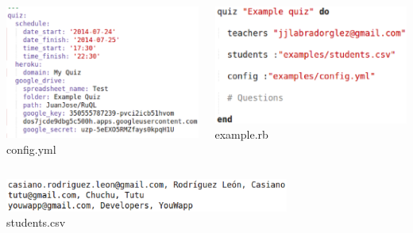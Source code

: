 \documentclass{beamer}
\begin{document}
\begin{frame}[allowframebreaks]
\begin{itemize}
    \begin{columns}[tc]
      \begin{column}{7cm}
        \includegraphics[width=1\textwidth]{img/yml.eps} \\
        \hspace*{1cm}
        config.yml
      \end{column}
      \begin{column}{5cm}
        \includegraphics[width=1\textwidth]{img/quiz_sinatra.eps} \\
        \hspace*{1cm}
        example.rb
      \end{column}
    \end{columns}
    \bigskip
    
    \begin{center}
      \includegraphics[width=0.7\textwidth]{img/csv.eps} \\
      students.csv
    \end{center}
    

\end{itemize}
\end{frame}
\end{document}
